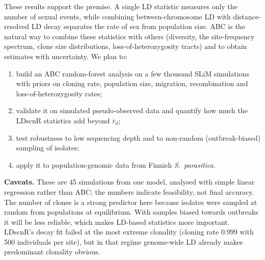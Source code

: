 \documentclass[10pt,a4paper]{article}
\begin{document}
These results support the premise. A single LD statistic measures only the number of sexual events, while combining between-chromosome LD with distance-resolved LD decay separates the rate of sex from population size. ABC is the natural way to combine these statistics with others (diversity, the site-frequency spectrum, clone size distributions, loss-of-heterozygosity tracts) and to obtain estimates with uncertainty. We plan to:
\begin{enumerate}\itemsep0pt
\item build an ABC random-forest analysis on a few thousand SLiM simulations with priors on cloning rate, population size, migration, recombination and loss-of-heterozygosity rates;
\item validate it on simulated pseudo-observed data and quantify how much the LDscnR statistics add beyond $\bar r_d$;
\item test robustness to low sequencing depth and to non-random (outbreak-biased) sampling of isolates;
\item apply it to population-genomic data from Finnish \emph{S.~parasitica}.
\end{enumerate}

\textbf{Caveats.} These are 45 simulations from one model, analysed with simple linear regression rather than ABC; the numbers indicate feasibility, not final accuracy. The number of clones is a strong predictor here because isolates were sampled at random from populations at equilibrium. With samples biased towards outbreaks it will be less reliable, which makes LD-based statistics more important. LDscnR's decay fit failed at the most extreme clonality (cloning rate 0.999 with 500 individuals per site), but in that regime genome-wide LD already makes predominant clonality obvious.
\end{document}

